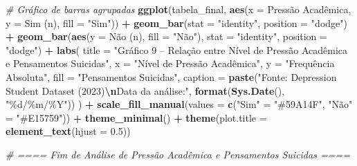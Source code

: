 \documentclass[
]{article}
\newenvironment{Shaded}{\begin{snugshade}}{\end{snugshade}}
\newcommand{\AttributeTok}[1]{\textcolor[rgb]{0.13,0.29,0.53}{#1}}
\newcommand{\CommentTok}[1]{\textcolor[rgb]{0.56,0.35,0.01}{\textit{#1}}}
\newcommand{\FloatTok}[1]{\textcolor[rgb]{0.00,0.00,0.81}{#1}}
\newcommand{\FunctionTok}[1]{\textcolor[rgb]{0.13,0.29,0.53}{\textbf{#1}}}
\newcommand{\NormalTok}[1]{#1}
\newcommand{\OtherTok}[1]{\textcolor[rgb]{0.56,0.35,0.01}{#1}}
\newcommand{\SpecialCharTok}[1]{\textcolor[rgb]{0.81,0.36,0.00}{\textbf{#1}}}
\newcommand{\StringTok}[1]{\textcolor[rgb]{0.31,0.60,0.02}{#1}}
\begin{document}
\begin{Shaded}
\begin{Highlighting}[]
\CommentTok{\# Gráfico de barras agrupadas}
\FunctionTok{ggplot}\NormalTok{(tabela\_final, }\FunctionTok{aes}\NormalTok{(}\AttributeTok{x =} \StringTok{\textasciigrave{}}\AttributeTok{Pressão Acadêmica}\StringTok{\textasciigrave{}}\NormalTok{, }\AttributeTok{y =} \StringTok{\textasciigrave{}}\AttributeTok{Sim (n)}\StringTok{\textasciigrave{}}\NormalTok{, }\AttributeTok{fill =} \StringTok{"Sim"}\NormalTok{)) }\SpecialCharTok{+}
  \FunctionTok{geom\_bar}\NormalTok{(}\AttributeTok{stat =} \StringTok{"identity"}\NormalTok{, }\AttributeTok{position =} \StringTok{"dodge"}\NormalTok{) }\SpecialCharTok{+}
  \FunctionTok{geom\_bar}\NormalTok{(}\FunctionTok{aes}\NormalTok{(}\AttributeTok{y =} \StringTok{\textasciigrave{}}\AttributeTok{Não (n)}\StringTok{\textasciigrave{}}\NormalTok{, }\AttributeTok{fill =} \StringTok{"Não"}\NormalTok{), }\AttributeTok{stat =} \StringTok{"identity"}\NormalTok{, }\AttributeTok{position =} \StringTok{"dodge"}\NormalTok{) }\SpecialCharTok{+}
  \FunctionTok{labs}\NormalTok{(}
    \AttributeTok{title =} \StringTok{"Gráfico 9 – Relação entre Nível de Pressão Acadêmica e Pensamentos Suicidas"}\NormalTok{,}
    \AttributeTok{x =} \StringTok{"Nível de Pressão Acadêmica"}\NormalTok{,}
    \AttributeTok{y =} \StringTok{"Frequência Absoluta"}\NormalTok{,}
    \AttributeTok{fill =} \StringTok{"Pensamentos Suicidas"}\NormalTok{,}
    \AttributeTok{caption =} \FunctionTok{paste}\NormalTok{(}\StringTok{"Fonte: Depression Student Dataset (2023)}\SpecialCharTok{\textbackslash{}n}\StringTok{Data da análise:"}\NormalTok{, }\FunctionTok{format}\NormalTok{(}\FunctionTok{Sys.Date}\NormalTok{(), }\StringTok{"\%d/\%m/\%Y"}\NormalTok{))}
\NormalTok{  ) }\SpecialCharTok{+}
  \FunctionTok{scale\_fill\_manual}\NormalTok{(}\AttributeTok{values =} \FunctionTok{c}\NormalTok{(}\StringTok{"Sim"} \OtherTok{=} \StringTok{"\#59A14F"}\NormalTok{, }\StringTok{"Não"} \OtherTok{=} \StringTok{"\#E15759"}\NormalTok{)) }\SpecialCharTok{+}
  \FunctionTok{theme\_minimal}\NormalTok{() }\SpecialCharTok{+}
  \FunctionTok{theme}\NormalTok{(}\AttributeTok{plot.title =} \FunctionTok{element\_text}\NormalTok{(}\AttributeTok{hjust =} \FloatTok{0.5}\NormalTok{))}

\CommentTok{\# ==== Fim de Análise de Pressão Acadêmica e Pensamentos Suicidas ====}


\end{Highlighting}
\end{Shaded}
\end{document}
